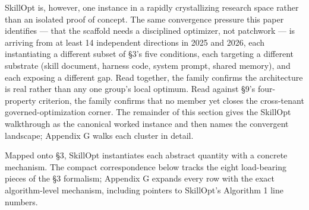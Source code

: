 \documentclass[
]{article}
\begin{document}
SkillOpt is, however, one instance in a rapidly crystallizing research
space rather than an isolated proof of concept. The same convergence
pressure this paper identifies --- that the scaffold needs a disciplined
optimizer, not patchwork --- is arriving from at least 14 independent
directions in 2025 and 2026, each instantiating a different subset of
§3's five conditions, each targeting a different substrate (skill
document, harness code, system prompt, shared memory), and each exposing
a different gap. Read together, the family confirms the architecture is
real rather than any one group's local optimum. Read against §9's
four-property criterion, the family confirms that no member yet closes
the cross-tenant governed-optimization corner. The remainder of this
section gives the SkillOpt walkthrough as the canonical worked instance
and then names the convergent landscape; Appendix G walks each cluster
in detail.

Mapped onto §3, SkillOpt instantiates each abstract quantity with a
concrete mechanism. The compact correspondence below tracks the eight
load-bearing pieces of the §3 formalism; Appendix G expands every row
with the exact algorithm-level mechanism, including pointers to
SkillOpt's Algorithm 1 line numbers.
\end{document}
